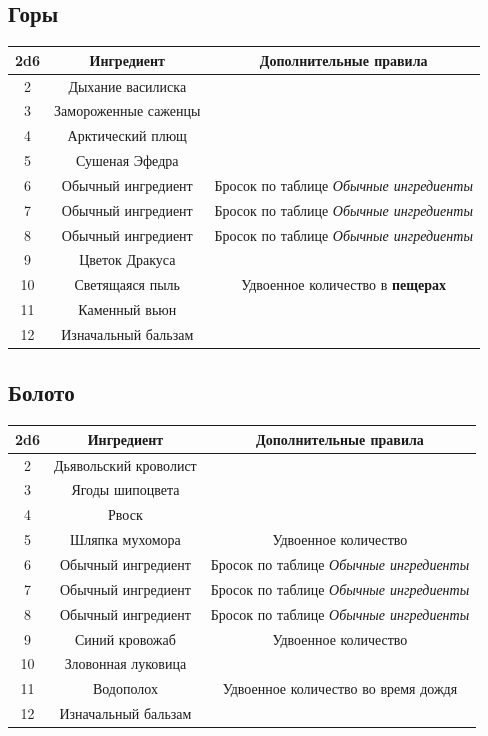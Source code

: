 \documentclass[a4paper, 9pt, twocolumn]{book}
\begin{document}
\subsection{Горы}

\begin{tabular}{|c|c|c|}
	\hline
	\textbf{2d6} & \textbf{Ингредиент} & \textbf{Дополнительные правила} \\
	\hline
	2 & Дыхание василиска &  \\
	\hline
	3 & Замороженные саженцы &  \\
	\hline
	4 & Арктический плющ &  \\
	\hline
	5 & Сушеная Эфедра &  \\
	\hline
	6 & Обычный ингредиент & Бросок по таблице \textit{Обычные ингредиенты} \\
	\hline
	7 & Обычный ингредиент & Бросок по таблице \textit{Обычные ингредиенты} \\
	\hline
	8 & Обычный ингредиент & Бросок по таблице \textit{Обычные ингредиенты} \\
	\hline
	9 & Цветок Дракуса &  \\
	\hline
	10 & Светящаяся пыль & Удвоенное количество в \textbf{пещерах} \\
	\hline
	11 & Каменный вьюн &  \\
	\hline
	12 & Изначальный бальзам &  \\
	\hline
\end{tabular}

\subsection{Болото}

\begin{tabular}{|c|c|c|}
	\hline
	\textbf{2d6} & \textbf{Ингредиент} & \textbf{Дополнительные правила} \\
	\hline
	2 & Дьявольский кроволист &  \\
	\hline
	3 & Ягоды шипоцвета &  \\
	\hline
	4 & Рвоск &  \\
	\hline
	5 & Шляпка мухомора & Удвоенное количество \\
	\hline
	6 & Обычный ингредиент & Бросок по таблице \textit{Обычные ингредиенты} \\
	\hline
	7 & Обычный ингредиент & Бросок по таблице \textit{Обычные ингредиенты} \\
	\hline
	8 & Обычный ингредиент & Бросок по таблице \textit{Обычные ингредиенты} \\
	\hline
	9 & Синий кровожаб & Удвоенное количество \\
	\hline
	10 & Зловонная луковица &  \\
	\hline
	11 & Водополох & Удвоенное количество во время дождя \\
	\hline
	12 & Изначальный бальзам &  \\
	\hline
\end{tabular}
\end{document}
